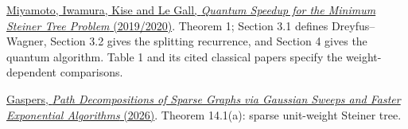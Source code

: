 \documentclass[11pt,a4paper]{article}
\theoremstyle{problemstyle}
\newenvironment{algorithmindex}[1]{%
  \begin{enumerate}[label={[#1.\arabic*]},leftmargin=3.4em,labelsep=0.6em,itemsep=4pt,topsep=3pt,parsep=0pt]
  \small
}{\end{enumerate}}
\begin{document}
\begin{algorithmindex}{11}
\item \href{https://arxiv.org/pdf/1904.03581}{Miyamoto, Iwamura, Kise and Le Gall, \emph{Quantum Speedup for the Minimum Steiner Tree Problem} (2019/2020)}. Theorem 1; Section 3.1 defines Dreyfus--Wagner, Section 3.2 gives the splitting recurrence, and Section 4 gives the quantum algorithm. Table 1 and its cited classical papers specify the weight-dependent comparisons.
\item \href{https://serggasp.github.io/pathwidth-site/papers/sparse-pathwidth/14-apps-connectivity.html}{Gaspers, \emph{Path Decompositions of Sparse Graphs via Gaussian Sweeps and Faster Exponential Algorithms} (2026)}. Theorem 14.1(a): sparse unit-weight Steiner tree.
\end{algorithmindex}
\end{document}
